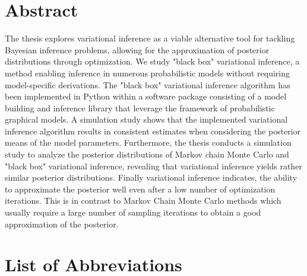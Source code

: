 \clearpage
{}


\section*{Abstract}

The thesis explores variational inference as a viable alternative tool for 
tackling Bayesian inference problems, allowing for the approximation of 
posterior distributions through optimization. We study "black box" variational inference, 
a method enabling inference in numerous probabilistic models without requiring model-specific derivations.
The "black box" variational inference algorithm has been implemented in Python 
within a software package consisting of a model building and inference library 
that leverage the framework of probabilistic graphical models.
A simulation study shows that the implemented variational inference algorithm results in 
consistent estimates when considering the posterior means of the model parameters. 
Furthermore, the thesis conducts a simulation study to analyze the posterior distributions 
of Markov chain Monte Carlo and "black box" variational inference, 
revealing that variational inference yields rather similar posterior distributions.
Finally variational inference indicates, the ability to 
approximate the posterior well even after a low number of optimization iterations. 
This is in contrast to Markov Chain Monte Carlo methods which usually require a 
large number of sampling iterations to obtain a good approximation of the posterior.

\clearpage

\setcounter{tocdepth}{2}
\tableofcontents
\clearpage

\listoffigures

\listofalgorithms 

\listoftables

\section*{List of Abbreviations}

